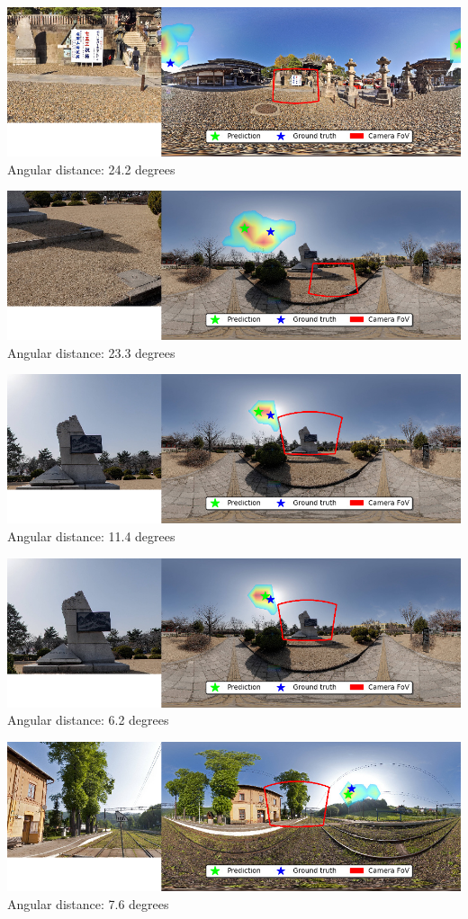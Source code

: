 \begin{multicols}{2}
\includegraphics[width=\mywidth]{pano_aaqpmaoqocdqfu.jpg}\\
Angular distance: 24.2 degrees

\includegraphics[width=\mywidth]{pano_aarqodbwuocbxc_005.jpg}\\
Angular distance: 23.3 degrees

\includegraphics[width=\mywidth]{pano_aarqodbwuocbxc_003.jpg}\\
Angular distance: 11.4 degrees

\includegraphics[width=\mywidth]{pano_aarqodbwuocbxc.jpg}\\
Angular distance: 6.2 degrees

\includegraphics[width=\mywidth]{pano_aasclkvkavzoym_003.jpg}\\
Angular distance: 7.6 degrees


\end{multicols}
